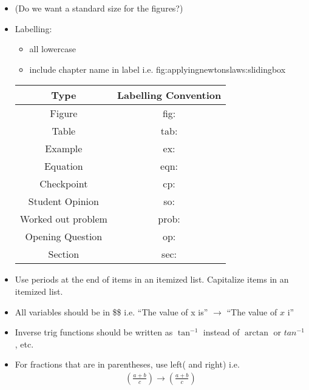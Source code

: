 \documentclass[11pt]{article}
\begin{document}
\begin{itemize}
\item (Do we want a standard size for the figures?)
\item Labelling:
\begin{itemize}
\item all lowercase 
\item include chapter name in label i.e. fig:applyingnewtonslaws:slidingbox
\end{itemize}
\begin{table}[h!]
\centering
\begin{tabular}{|c|c|}
\hline
\textbf{Type}      & \textbf{Labelling Convention} \\ \hline
Figure             & fig:                          \\ \hline
Table              & tab:                          \\ \hline
Example            & ex:                           \\ \hline
Equation           & eqn:                          \\ \hline
Checkpoint         & cp:                           \\ \hline
Student Opinion    & so:                           \\ \hline
Worked out problem & prob:                         \\ \hline
Opening Question   & op:                           \\ \hline
Section            & sec:                           \\ \hline
\end{tabular}
\end{table}
\item Use periods at the end of items in an itemized list. Capitalize items in an itemized list. 
\item All variables should be in \$\$ i.e. ``The value of  x is'' $\rightarrow$ ``The value of $x$ i''
\item Inverse trig functions should be written as $\tan^{-1}$ instead of $\arctan$ or $tan^{-1}$, etc.
\item For fractions that are in parentheses, use left( and right) i.e.
\begin{align*}
(\frac{a+b}{c}) \rightarrow \left(\frac{a+b}{c}\right) 
\end{align*}


\end{itemize}
\end{document}
